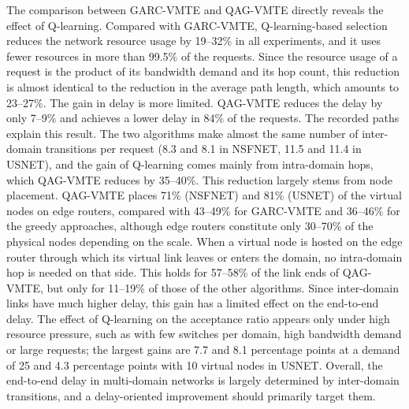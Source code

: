 The comparison between GARC-VMTE and QAG-VMTE directly reveals the effect of Q-learning. Compared with GARC-VMTE, Q-learning-based selection reduces the network resource usage by 19--32\% in all experiments, and it uses fewer resources in more than 99.5\% of the requests. Since the resource usage of a request is the product of its bandwidth demand and its hop count, this reduction is almost identical to the reduction in the average path length, which amounts to 23--27\%. The gain in delay is more limited. QAG-VMTE reduces the delay by only 7--9\% and achieves a lower delay in 84\% of the requests. The recorded paths explain this result. The two algorithms make almost the same number of inter-domain transitions per request (8.3 and 8.1 in NSFNET, 11.5 and 11.4 in USNET), and the gain of Q-learning comes mainly from intra-domain hops, which QAG-VMTE reduces by 35--40\%. This reduction largely stems from node placement. QAG-VMTE places 71\% (NSFNET) and 81\% (USNET) of the virtual nodes on edge routers, compared with 43--49\% for GARC-VMTE and 36--46\% for the greedy approaches, although edge routers constitute only 30--70\% of the physical nodes depending on the scale. When a virtual node is hosted on the edge router through which its virtual link leaves or enters the domain, no intra-domain hop is needed on that side. This holds for 57--58\% of the link ends of QAG-VMTE, but only for 11--19\% of those of the other algorithms. Since inter-domain links have much higher delay, this gain has a limited effect on the end-to-end delay. The effect of Q-learning on the acceptance ratio appears only under high resource pressure, such as with few switches per domain, high bandwidth demand or large requests; the largest gains are 7.7 and 8.1 percentage points at a demand of 25 and 4.3 percentage points with 10 virtual nodes in USNET. Overall, the end-to-end delay in multi-domain networks is largely determined by inter-domain transitions, and a delay-oriented improvement should primarily target them.

